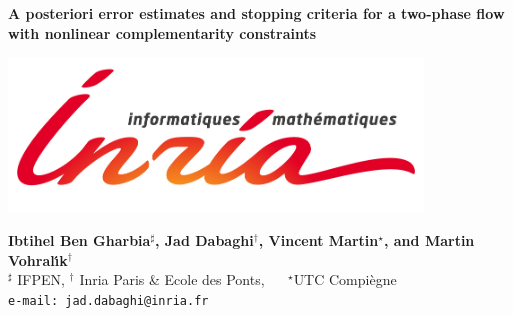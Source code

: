 \documentclass[a0,portrait]{a0poster}
\begin{document}

\begin{tcolorbox}[enhanced, breakable,colback=white,frame style={left color=white!25!black,
right color=blue!75!black},
width=\dimexpr\textwidth\relax,enlarge left by=0mm,
bottomrule=3mm, leftrule=3mm, rightrule=3mm, toprule=3mm]
\begin{minipage}[t]{\linewidth}
\begin{center}
\veryHuge \color{blue} \textbf{A posteriori error estimates and stopping criteria for a two-phase flow with nonlinear complementarity constraints}
\color{black} %
\end{center}
\end{minipage}
\begin{minipage}[c]{0.10\linewidth}
\includegraphics[width=11cm]{inria}\\
\end{minipage}
\begin{minipage}[c]{0.77\linewidth}
\huge\center \textbf{Ibtihel Ben Gharbia$^{\sharp}$, Jad Dabaghi$^{\dagger}$, Vincent Martin$^\star$, and
Martin Vohral{\'{\i}}k$^{\dagger}$}\\[0.5cm]
\center $^{\sharp}$ IFPEN, \quad  $^\dagger$ Inria Paris \& Ecole des Ponts, $\quad$
$^\star$UTC Compiègne \\[0.4cm]
\Large \texttt{e-mail: jad.dabaghi@inria.fr} \\
\end{minipage}
\begin{minipage}[c]{0.10\linewidth}

\end{minipage}
\end{tcolorbox}
\end{document}
